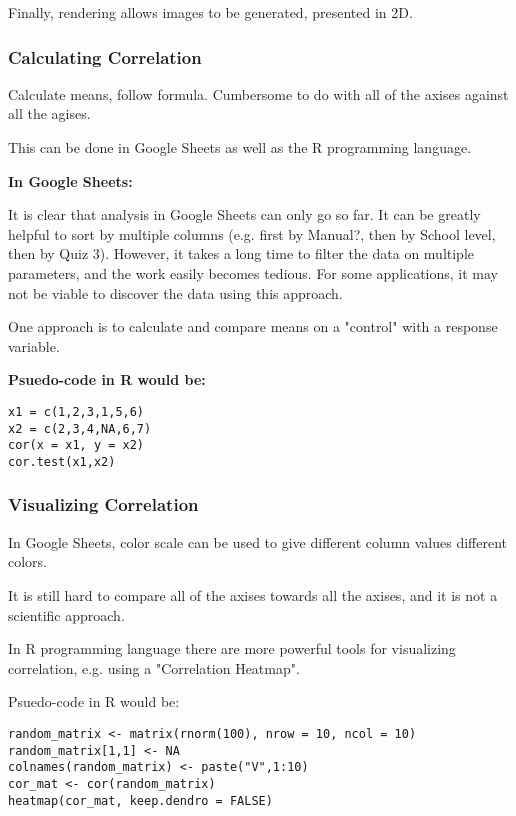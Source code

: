 Finally, rendering allows images to be generated, presented in 2D.

\subsubsection{Calculating Correlation}

Calculate means, follow formula. Cumbersome to do with all of the axises against all the agises.

This can be done in Google Sheets as well as the R programming language.

\textbf{In Google Sheets: }

It is clear that analysis in Google Sheets can only go so far. It can be greatly helpful to sort by multiple columns (e.g. first by Manual?, then by School level, then by Quiz 3). However, it takes a long time to filter the data on multiple parameters, and the work easily becomes tedious. For some applications, it may not be viable to discover the data using this approach.

One approach is to calculate and compare means on a "control"  with a response variable.

\textbf{Psuedo-code in R would be: }

\begin{verbatim}
x1 = c(1,2,3,1,5,6)
x2 = c(2,3,4,NA,6,7)
cor(x = x1, y = x2)
cor.test(x1,x2)
\end{verbatim}

\subsubsection{Visualizing Correlation}

In Google Sheets, color scale can be used to give different column values different colors.

It is still hard to compare all of the axises towards all the axises, and it is not a scientific approach.


In R programming language there are more powerful tools for visualizing correlation, e.g. using a "Correlation Heatmap".

Psuedo-code in R would be:

\begin{verbatim}
random_matrix <- matrix(rnorm(100), nrow = 10, ncol = 10)
random_matrix[1,1] <- NA
colnames(random_matrix) <- paste("V",1:10)
cor_mat <- cor(random_matrix)
heatmap(cor_mat, keep.dendro = FALSE)
\end{verbatim}


